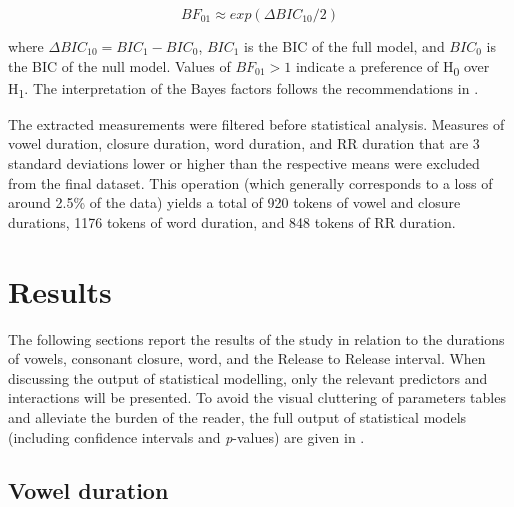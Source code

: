 \documentclass[preprint]{JASAnew}
\begin{document}
\begin{equation}
\label{eq:bayes}
BF_{01} \approx exp(\Delta{}BIC_{10}/2)
\end{equation}

where \(\Delta{}BIC_{10} = BIC_1 - BIC_0\), \(BIC_1\) is the BIC of the
full model, and \(BIC_0\) is the BIC of the null model. Values of
\(BF_{01} > 1\) indicate a preference of H\textsubscript{0} over
H\textsubscript{1}. The interpretation of the Bayes factors follows the
recommendations in \citet[p.~139]{raftery1995}.

The extracted measurements were filtered before statistical analysis.
Measures of vowel duration, closure duration, word duration, and RR
duration that are 3 standard deviations lower or higher than the
respective means were excluded from the final dataset. This operation
(which generally corresponds to a loss of around 2.5\% of the data)
yields a total of 920 tokens of vowel and closure durations, 1176 tokens
of word duration, and 848 tokens of RR duration.

\hypertarget{results}{%
\section{Results}\label{results}}

The following sections report the results of the study in relation to
the durations of vowels, consonant closure, word, and the Release to
Release interval. When discussing the output of statistical modelling,
only the relevant predictors and interactions will be presented. To
avoid the visual cluttering of parameters tables and alleviate the
burden of the reader, the full output of statistical models (including
confidence intervals and \emph{p}-values) are given in .

\hypertarget{vowel-duration}{%
\subsection{Vowel duration}\label{vowel-duration}}
\end{document}
